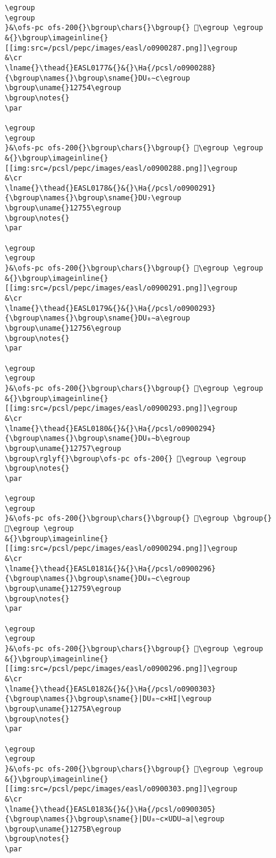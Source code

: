 \begin{verbatim}
\egroup
\egroup
}&\ofs-pc ofs-200{}\bgroup\chars{}\bgroup{} 𒝓\egroup \egroup
&{}\bgroup\imageinline{}[[img:src=/pcsl/pepc/images/easl/o0900287.png]]\egroup
&\cr
\lname{}\thead{}EASL0177&{}&{}\Ha{/pcsl/o0900288}{\bgroup\names{}\bgroup\sname{}DU₆∼c\egroup
\bgroup\uname{}12754\egroup
\bgroup\notes{}
\par 

\egroup
\egroup
}&\ofs-pc ofs-200{}\bgroup\chars{}\bgroup{} 𒝔\egroup \egroup
&{}\bgroup\imageinline{}[[img:src=/pcsl/pepc/images/easl/o0900288.png]]\egroup
&\cr
\lname{}\thead{}EASL0178&{}&{}\Ha{/pcsl/o0900291}{\bgroup\names{}\bgroup\sname{}DU₇\egroup
\bgroup\uname{}12755\egroup
\bgroup\notes{}
\par 

\egroup
\egroup
}&\ofs-pc ofs-200{}\bgroup\chars{}\bgroup{} 𒝕\egroup \egroup
&{}\bgroup\imageinline{}[[img:src=/pcsl/pepc/images/easl/o0900291.png]]\egroup
&\cr
\lname{}\thead{}EASL0179&{}&{}\Ha{/pcsl/o0900293}{\bgroup\names{}\bgroup\sname{}DU₈∼a\egroup
\bgroup\uname{}12756\egroup
\bgroup\notes{}
\par 

\egroup
\egroup
}&\ofs-pc ofs-200{}\bgroup\chars{}\bgroup{} 𒝖\egroup \egroup
&{}\bgroup\imageinline{}[[img:src=/pcsl/pepc/images/easl/o0900293.png]]\egroup
&\cr
\lname{}\thead{}EASL0180&{}&{}\Ha{/pcsl/o0900294}{\bgroup\names{}\bgroup\sname{}DU₈∼b\egroup
\bgroup\uname{}12757\egroup
\bgroup\rglyf{}\bgroup\ofs-pc ofs-200{} 𒝗\egroup \egroup
\bgroup\notes{}
\par 

\egroup
\egroup
}&\ofs-pc ofs-200{}\bgroup\chars{}\bgroup{} 𒝗\egroup \bgroup{} 𒝘\egroup \egroup
&{}\bgroup\imageinline{}[[img:src=/pcsl/pepc/images/easl/o0900294.png]]\egroup
&\cr
\lname{}\thead{}EASL0181&{}&{}\Ha{/pcsl/o0900296}{\bgroup\names{}\bgroup\sname{}DU₈∼c\egroup
\bgroup\uname{}12759\egroup
\bgroup\notes{}
\par 

\egroup
\egroup
}&\ofs-pc ofs-200{}\bgroup\chars{}\bgroup{} 𒝙\egroup \egroup
&{}\bgroup\imageinline{}[[img:src=/pcsl/pepc/images/easl/o0900296.png]]\egroup
&\cr
\lname{}\thead{}EASL0182&{}&{}\Ha{/pcsl/o0900303}{\bgroup\names{}\bgroup\sname{}|DU₈∼c×HI|\egroup
\bgroup\uname{}1275A\egroup
\bgroup\notes{}
\par 

\egroup
\egroup
}&\ofs-pc ofs-200{}\bgroup\chars{}\bgroup{} 𒝚\egroup \egroup
&{}\bgroup\imageinline{}[[img:src=/pcsl/pepc/images/easl/o0900303.png]]\egroup
&\cr
\lname{}\thead{}EASL0183&{}&{}\Ha{/pcsl/o0900305}{\bgroup\names{}\bgroup\sname{}|DU₈∼c×UDU∼a|\egroup
\bgroup\uname{}1275B\egroup
\bgroup\notes{}
\par 


\end{verbatim}
